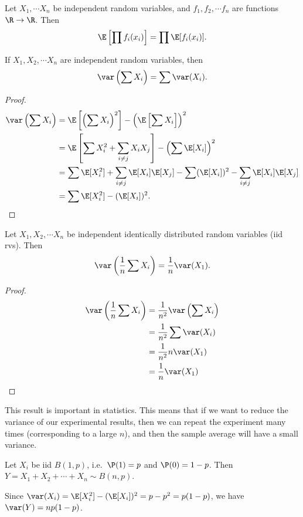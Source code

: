 \documentclass[a4paper]{article}
\begin{document}
\begin{cor}
  Let $X_1,\cdots X_n$ be independent random variables, and $f_1, f_2, \cdots f_n$ are functions $\R\to \R$. Then
  \[
    \E\left[\prod f_i(x_i)\right] = \prod \E[f_i(x_i)].
  \]
\end{cor}

\begin{thm}
  If $X_1, X_2, \cdots X_n$ are independent random variables, then
  \[
    \var\left(\sum X_i\right) = \sum \var (X_i).
  \]
\end{thm}

\begin{proof}
  \begin{align*}
    \var\left(\sum X_i\right) &= \E\left[\left(\sum X_i\right)^2\right] - \left(\E\left[\sum X_i\right]\right)^2\\
    &= \E\left[\sum X_i^2 + \sum_{i \not =j} X_iX_j\right] - \left(\sum\E [X_i]\right)^2\\
    &= \sum \E[X_i^2] + \sum_{i\not= j}\E[X_i]\E[X_j] - \sum(\E[X_i])^2 - \sum_{i\not= j}\E[X_i]\E[X_j]\\
    &= \sum \E[X_i^2] - (\E[X_i])^2.
  \end{align*}
\end{proof}

\begin{cor}
 Let $X_1, X_2, \cdots X_n$ be independent identically distributed random variables (iid rvs). Then
 \[
   \var\left(\frac{1}{n}\sum X_i\right) = \frac{1}{n}\var (X_1).
 \]
\end{cor}

\begin{proof}
  \begin{align*}
    \var\left(\frac{1}{n}\sum X_i\right) &= \frac{1}{n^2}\var\left(\sum X_i\right)\\
    &= \frac{1}{n^2}\sum \var(X_i)\\
    &= \frac{1}{n^2} n \var(X_1)\\
    &= \frac{1}{n}\var (X_1)
  \end{align*}
\end{proof}
This result is important in statistics. This means that if we want to reduce the variance of our experimental results, then we can repeat the experiment many times (corresponding to a large $n$), and then the sample average will have a small variance.

\begin{eg}
  Let $X_i$ be iid $B(1, p)$, i.e.\ $\P(1) = p$ and $\P(0) = 1 - p$. Then $Y = X_1 + X_2 + \cdots + X_n \sim B(n, p)$.

  Since $\var(X_i) = \E[X_i^2] - (\E[X_i])^2 = p - p^2 = p(1 - p)$, we have $\var (Y) = np(1 - p)$.
\end{eg}
\end{document}

